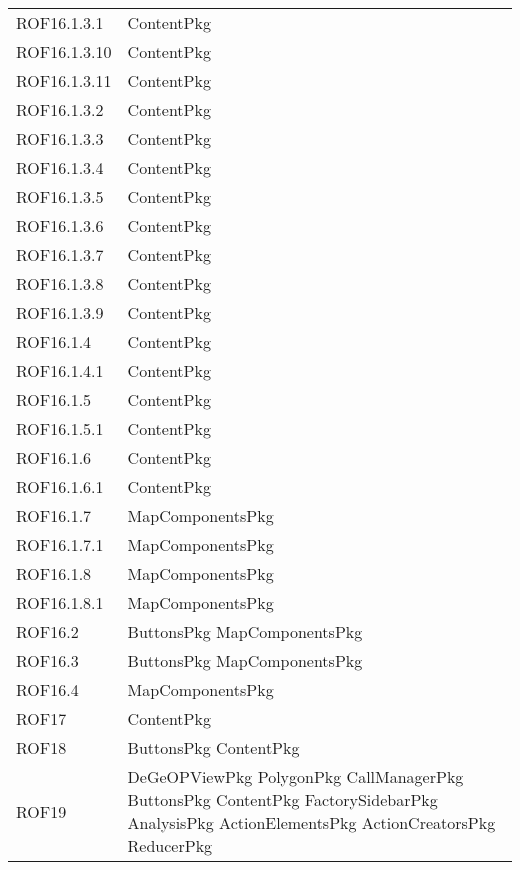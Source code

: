 \begin{longtable}{p{2.5cm}!{\VRule[1pt]}p{5cm}}
		ROF16.1.3.1 & ContentPkg\\
		ROF16.1.3.10 & ContentPkg\\
		ROF16.1.3.11 & ContentPkg\\
		ROF16.1.3.2 & ContentPkg\\
		ROF16.1.3.3 & ContentPkg\\
		ROF16.1.3.4 & ContentPkg\\
		ROF16.1.3.5 & ContentPkg\\
		ROF16.1.3.6 & ContentPkg\\
		ROF16.1.3.7 & ContentPkg\\
		ROF16.1.3.8 & ContentPkg\\
		ROF16.1.3.9 & ContentPkg\\
		ROF16.1.4 & ContentPkg\\
		ROF16.1.4.1 & ContentPkg\\
		ROF16.1.5 & ContentPkg\\
		ROF16.1.5.1 & ContentPkg\\
		ROF16.1.6 & ContentPkg\\
		ROF16.1.6.1 & ContentPkg\\
		ROF16.1.7 & MapComponentsPkg\\
		ROF16.1.7.1 & MapComponentsPkg\\
		ROF16.1.8 & MapComponentsPkg\\
		ROF16.1.8.1 & MapComponentsPkg\\
		ROF16.2 & ButtonsPkg \newline MapComponentsPkg\\
		ROF16.3 & ButtonsPkg \newline MapComponentsPkg\\
		ROF16.4 & MapComponentsPkg\\
		ROF17 & ContentPkg\\
		ROF18 & ButtonsPkg \newline ContentPkg\\
		ROF19 & DeGeOPViewPkg \newline PolygonPkg \newline CallManagerPkg \newline ButtonsPkg \newline ContentPkg \newline FactorySidebarPkg \newline AnalysisPkg \newline ActionElementsPkg \newline ActionCreatorsPkg \newline ReducerPkg\\

\end{longtable}
